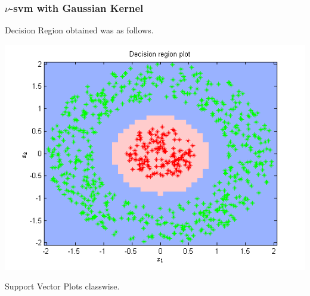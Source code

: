\documentclass{article}
\begin{document}
\subsubsection{$\nu$-svm with Gaussian Kernel}
Decision Region obtained was as follows.
\begin{center}
\includegraphics[scale=1]{Classification/1b/nu_g/dec}
\end{center}
Support Vector Plots classwise.
\end{document}
